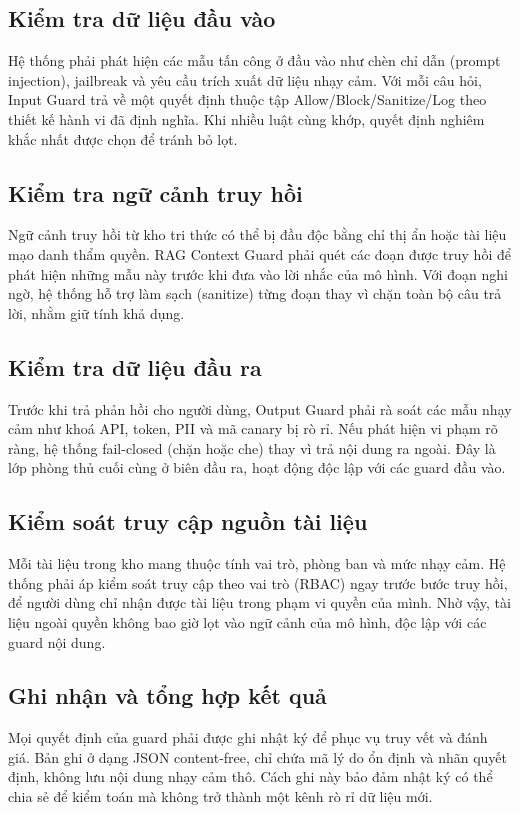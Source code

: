 \subsection{Kiểm tra dữ liệu đầu vào}
Hệ thống phải phát hiện các mẫu tấn công ở đầu vào như chèn chỉ dẫn (prompt
injection), jailbreak và yêu cầu trích xuất dữ liệu nhạy cảm. Với mỗi câu hỏi,
Input Guard trả về một quyết định thuộc tập Allow/Block/Sanitize/Log theo thiết
kế hành vi đã định nghĩa. Khi nhiều luật cùng khớp, quyết định nghiêm khắc nhất
được chọn để tránh bỏ lọt.

\subsection{Kiểm tra ngữ cảnh truy hồi}
Ngữ cảnh truy hồi từ kho tri thức có thể bị đầu độc bằng chỉ thị ẩn hoặc tài liệu
mạo danh thẩm quyền. RAG Context Guard phải quét các đoạn được truy hồi để phát
hiện những mẫu này trước khi đưa vào lời nhắc của mô hình. Với đoạn nghi ngờ, hệ
thống hỗ trợ làm sạch (sanitize) từng đoạn thay vì chặn toàn bộ câu trả lời, nhằm
giữ tính khả dụng.

\subsection{Kiểm tra dữ liệu đầu ra}
Trước khi trả phản hồi cho người dùng, Output Guard phải rà soát các mẫu nhạy cảm
như khoá API, token, PII và mã canary bị rò rỉ. Nếu phát hiện vi phạm rõ ràng, hệ
thống fail-closed (chặn hoặc che) thay vì trả nội dung ra ngoài. Đây là lớp phòng
thủ cuối cùng ở biên đầu ra, hoạt động độc lập với các guard đầu vào.

\subsection{Kiểm soát truy cập nguồn tài liệu}
Mỗi tài liệu trong kho mang thuộc tính vai trò, phòng ban và mức nhạy cảm. Hệ
thống phải áp kiểm soát truy cập theo vai trò (RBAC) ngay trước bước truy hồi, để
người dùng chỉ nhận được tài liệu trong phạm vi quyền của mình. Nhờ vậy, tài liệu
ngoài quyền không bao giờ lọt vào ngữ cảnh của mô hình, độc lập với các guard nội
dung.

\subsection{Ghi nhận và tổng hợp kết quả}
Mọi quyết định của guard phải được ghi nhật ký để phục vụ truy vết và đánh giá.
Bản ghi ở dạng JSON content-free, chỉ chứa mã lý do ổn định và nhãn quyết định,
không lưu nội dung nhạy cảm thô. Cách ghi này bảo đảm nhật ký có thể chia sẻ để
kiểm toán mà không trở thành một kênh rò rỉ dữ liệu mới.

